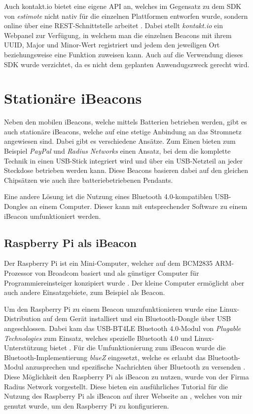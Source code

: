 Auch kontakt.io bietet eine eigene API an, welches im Gegensatz zu dem SDK von \emph{estimote} nicht nativ für die einzelnen Plattformen entworfen wurde, sondern online über eine REST-Schnittstelle arbeitet \cite{kontaktapi}.
Dabei stellt \emph{kontakt.io} ein Webpanel zur Verfügung, in welchem man die einzelnen Beacons mit ihrem UUID, Major und Minor-Wert registriert und jedem den jeweiligen Ort beziehungsweise eine Funktion zuweisen kann. 
Auch auf die Verwendung dieses SDK wurde verzichtet, da es nicht dem geplanten Anwendugszweck gerecht wird.


\section{Stationäre iBeacons}
\label{sec:dataandmeasurement:stationarybeacon}
Neben den mobilen iBeacons, welche mittels Batterien betrieben werden, gibt es auch stationäre iBeacons, welche auf eine stetige Anbindung an das Stromnetz angewiesen sind.
Dabei gibt es verschiedene Ansätze.
Zum Einen bieten zum Beispiel \emph{PayPal} und \emph{Radius Networks} einen Ansatz, bei dem die komplette Technik in einen USB-Stick integriert wird und über ein USB-Netzteil an jeder Steckdose betrieben werden kann. Diese Beacons basieren dabei auf den gleichen Chipsätzen wie auch ihre batteriebetriebenen Pendants.

Eine andere Lösung ist die Nutzung eines Bluetooth 4.0-kompatiblen USB-Dongles an einem Computer. Dieser kann mit entsprechender Software zu einem iBeacon umfunktioniert werden.

\subsection{Raspberry Pi als iBeacon}
\label{sec:dataandmeasurement:stationarybeacon:raspberrypi}
Der Raspberry Pi ist ein Mini-Computer, welcher auf dem BCM2835 ARM-Prozessor von Broadcom basiert und als günstiger Computer für Programmiereinsteiger konzipiert wurde \cite{raspberrypi}. Der kleine Computer ermöglicht aber auch andere Einsatzgebiete, zum Beispiel als Beacon.

Um den Raspberry Pi zu einem Beacon umzufunktionieren wurde eine Linux-Distribution auf dem Gerät installiert und ein Bluetooth-Dongle über USB angeschlossen. Dabei kam das USB-BT4LE Bluetooth 4.0-Modul von \emph{Plugable Technologies} zum Einsatz, welches spezielle Bluetooth 4.0 und Linux-Unterstützung bietet \cite{plugable}.
Für die Umfunktionierung zum iBeacon wurde die Bluetooth-Implementierung \emph{blueZ} eingesetzt, welche es erlaubt das Bluetooth-Modul anzusprechen und spezifische Nachrichten über Bluetooth zu versenden \cite{bluez}.
Diese Möglichkeit den Raspberry Pi als iBeacon zu nutzen, wurde von der Firma Radius Network vorgestellt. Diese bieten ein ausführliches Tutorial für die Nutzung des Raspberry Pi als iBeacon auf ihrer Webseite an \cite{radiusraspberry}, welches von mir genutzt wurde, um den Raspberry Pi zu konfigurieren.

